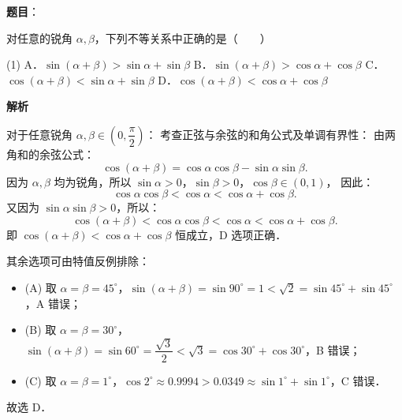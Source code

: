 \begin{answer}

\textbf{题目}：

对任意的锐角 $\alpha, \beta$，下列不等关系中正确的是\mbox{（　　）}

\begin{gkopts}(1)
\task A．$\sin(\alpha + \beta) > \sin\alpha + \sin\beta$
\task B．$\sin(\alpha + \beta) > \cos\alpha + \cos\beta$
\task C．$\cos(\alpha + \beta) < \sin\alpha + \sin\beta$
\task D．$\cos(\alpha + \beta) < \cos\alpha + \cos\beta$
\end{gkopts}

\textbf{解析}

对于任意锐角 $\alpha, \beta \in \left(0, \dfrac{\pi}{2}\right)$：
考查正弦与余弦的和角公式及单调有界性：
由两角和的余弦公式：
\nopagebreak[4]
\[
\cos(\alpha + \beta) = \cos\alpha\cos\beta - \sin\alpha\sin\beta.
\]
因为 $\alpha, \beta$ 均为锐角，所以 $\sin\alpha > 0$，$\sin\beta > 0$，$\cos\beta \in (0, 1)$，
因此：
\nopagebreak[4]
\[
\cos\alpha\cos\beta < \cos\alpha < \cos\alpha + \cos\beta.
\]
又因为 $\sin\alpha\sin\beta > 0$，所以：
\nopagebreak[4]
\[
\cos(\alpha + \beta) < \cos\alpha\cos\beta < \cos\alpha < \cos\alpha + \cos\beta.
\]
即 $\cos(\alpha + \beta) < \cos\alpha + \cos\beta$ 恒成立，D 选项正确．

其余选项可由特值反例排除：
\begin{itemize}
\item (A) 取 $\alpha = \beta = 45^\circ$，$\sin(\alpha + \beta) = \sin 90^\circ = 1 < \sqrt{2} = \sin 45^\circ + \sin 45^\circ$，A 错误；
\item (B) 取 $\alpha = \beta = 30^\circ$，$\sin(\alpha + \beta) = \sin 60^\circ = \dfrac{\sqrt{3}}{2} < \sqrt{3} = \cos 30^\circ + \cos 30^\circ$，B 错误；
\item (C) 取 $\alpha = \beta = 1^\circ$，$\cos 2^\circ \approx 0.9994 > 0.0349 \approx \sin 1^\circ + \sin 1^\circ$，C 错误．
\end{itemize}

故选 D．


\end{answer}

